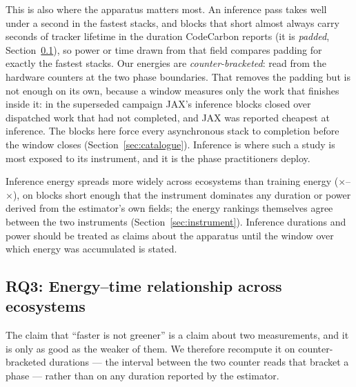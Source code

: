 This is also where the apparatus matters most. An inference pass takes well
under a second in the fastest stacks, and blocks that short almost always carry
seconds of tracker lifetime in the duration CodeCarbon reports (it is
\emph{padded}, Section~\ref{subsec:rq3}), so power or time drawn from that field
compares padding for exactly the fastest stacks. Our energies are
\emph{counter-bracketed}: read from the hardware counters at the two phase
boundaries. That removes the padding but is not enough on its own, because a
window measures only the work that finishes inside it: in the superseded
campaign JAX's inference blocks closed over dispatched work that had not
completed, and JAX was reported cheapest at inference. The blocks here force every asynchronous
stack to completion before the window closes (Section~\ref{sec:catalogue}).
Inference is where such a study is most exposed to its instrument, and it is
the phase practitioners deploy.

\begin{tcolorbox}[colback=gray!5!white, colframe=gray!40!black, title=\textbf{RQ2 Findings: Impact of Ecosystems on Inference Energy Efficiency}]
\small
Inference energy spreads more widely across ecosystems than training energy
(\vSpreadInferMin$\times$--\vSpreadInferMax$\times$), on blocks short enough
that the instrument dominates any duration or power derived from the
estimator's own fields; the energy rankings themselves agree between the two
instruments (Section~\ref{sec:instrument}). Inference durations and power should
be treated as claims about the apparatus until the window over which energy was
accumulated is stated.
\end{tcolorbox}

\subsection{RQ3: Energy--time relationship across ecosystems}
\label{subsec:rq3}

The claim that ``faster is not greener'' is a claim about two measurements, and
it is only as good as the weaker of them. We therefore recompute it on
counter-bracketed durations --- the interval between the two counter reads that
bracket a phase --- rather than on any duration reported by the estimator.

